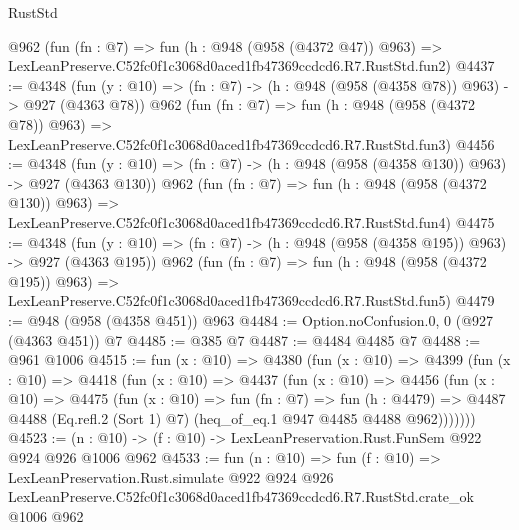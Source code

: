 \begin{lexlean}{RustStd}
\begin{coremodule}
    @962
    (fun (fn : @7) =>
    fun (h : @948 (@958 (@4372 @47)) @963) =>
    LexLeanPreserve.C52fc0f1c3068d0aced1fb47369ccdcd6.R7.RustStd.fun2)
@4437 := @4348
    (fun (y : @10) => (fn : @7) -> (h : @948 (@958 (@4358 @78)) @963) -> @927 (@4363 @78))
    @962
    (fun (fn : @7) =>
    fun (h : @948 (@958 (@4372 @78)) @963) =>
    LexLeanPreserve.C52fc0f1c3068d0aced1fb47369ccdcd6.R7.RustStd.fun3)
@4456 := @4348
    (fun (y : @10) => (fn : @7) -> (h : @948 (@958 (@4358 @130)) @963) -> @927 (@4363 @130))
    @962
    (fun (fn : @7) =>
    fun (h : @948 (@958 (@4372 @130)) @963) =>
    LexLeanPreserve.C52fc0f1c3068d0aced1fb47369ccdcd6.R7.RustStd.fun4)
@4475 := @4348
    (fun (y : @10) => (fn : @7) -> (h : @948 (@958 (@4358 @195)) @963) -> @927 (@4363 @195))
    @962
    (fun (fn : @7) =>
    fun (h : @948 (@958 (@4372 @195)) @963) =>
    LexLeanPreserve.C52fc0f1c3068d0aced1fb47369ccdcd6.R7.RustStd.fun5)
@4479 := @948 (@958 (@4358 @451)) @963
@4484 := Option.noConfusion.{0, 0} (@927 (@4363 @451)) @7
@4485 := @385 @7
@4487 := @4484 @4485 @7
@4488 := @961 @1006
@4515 := fun (x : @10) =>
  @4380
    (fun (x : @10) =>
    @4399
      (fun (x : @10) =>
      @4418
        (fun (x : @10) =>
        @4437
          (fun (x : @10) =>
          @4456
            (fun (x : @10) =>
            @4475
              (fun (x : @10) =>
              fun (fn : @7) =>
              fun (h : @4479) =>
              @4487 @4488 (Eq.refl.{2} (Sort 1) @7) (heq_of_eq.{1} @947 @4485 @4488 @962)))))))
@4523 := (n : @10) -> (f : @10) -> LexLeanPreservation.Rust.FunSem @922 @924 @926 @1006 @962
@4533 := fun (n : @10) =>
  fun (f : @10) =>
  LexLeanPreservation.Rust.simulate
    @922
    @924
    @926
    LexLeanPreserve.C52fc0f1c3068d0aced1fb47369ccdcd6.R7.RustStd.crate_ok
    @1006
    @962
\end{coremodule}
\end{lexlean}
